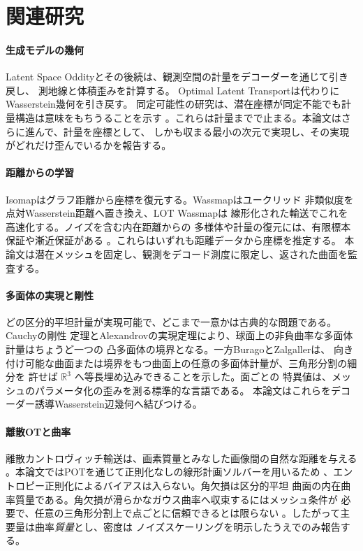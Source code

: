 \section{関連研究}

\paragraph{生成モデルの幾何}
Latent Space Oddityとその後続は、観測空間の計量をデコーダーを通じて引き戻し、
測地線と体積歪みを計算する\cite{arvanitidis2018,chen2018,arvanitidis2022}。
Optimal Latent Transportは代わりにWasserstein幾何を引き戻す\cite{roy2022}。
同定可能性の研究は、潜在座標が同定不能でも計量構造は意味をもちうることを示す
\cite{syrota2025}。これらは計量までで止まる。本論文はさらに進んで、計量を座標として、
しかも収まる最小の次元で実現し、その実現がどれだけ歪んでいるかを報告する。

\paragraph{距離からの学習}
Isomapはグラフ距離から座標を復元する\cite{tenenbaum2000}。Wassmapはユークリッド
非類似度を点対Wasserstein距離へ置き換え\cite{hamm2023wassmap}、LOT Wassmapは
線形化された輸送でこれを高速化する\cite{cloninger2025}。ノイズを含む内在距離からの
多様体や計量の復元には、有限標本保証や漸近保証がある
\cite{qiu2023,fefferman2020,hamm2025}。これらはいずれも距離データから座標を推定する。
本論文は潜在メッシュを固定し、観測をデコード測度に限定し、返された曲面を監査する。

\paragraph{多面体の実現と剛性}
どの区分的平坦計量が実現可能で、どこまで一意かは古典的な問題である。Cauchyの剛性
定理とAlexandrovの実現定理により、球面上の非負曲率な多面体計量はちょうど一つの
凸多面体の境界となる\cite{alexandrov2005,pak2010}。一方BuragoとZalgallerは、
向き付け可能な曲面または境界をもつ曲面上の任意の多面体計量が、三角形分割の細分を
許せば $\mathbb R^3$ へ等長埋め込みできることを示した\cite{burago1995}。面ごとの
特異値は、メッシュのパラメータ化の歪みを測る標準的な言語である\cite{lipman2012}。
本論文はこれらをデコーダー誘導Wasserstein辺幾何へ結びつける。

\paragraph{離散OTと曲率}
離散カントロヴィッチ輸送は、画素質量とみなした画像間の自然な距離を与える
\cite{peyre2019}。本論文ではPOTを通じて正則化なしの線形計画ソルバーを用いるため
\cite{flamary2021}、エントロピー正則化によるバイアスは入らない。角欠損は区分的平坦
曲面の内在曲率質量である。角欠損が滑らかなガウス曲率へ収束するにはメッシュ条件が
必要で、任意の三角形分割上で点ごとに信頼できるとは限らない
\cite{gawlik2020,hartig2021}。したがって主要量は曲率\emph{質量}とし、密度は
ノイズスケーリングを明示したうえでのみ報告する。

